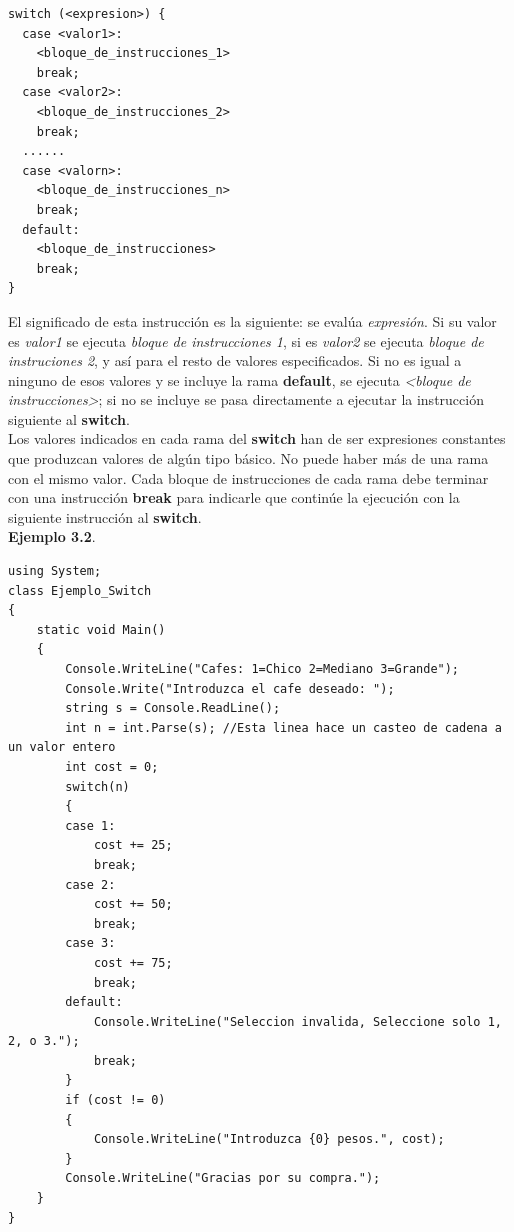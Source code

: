 \documentclass[12pt,a4paper]{report}
\begin{document}
\begin{lstlisting}
switch (<expresion>) {
  case <valor1>: 
    <bloque_de_instrucciones_1>
    break;
  case <valor2>: 
    <bloque_de_instrucciones_2>
    break;
  ......
  case <valorn>: 
    <bloque_de_instrucciones_n>
    break;
  default:
    <bloque_de_instrucciones>
    break;
}
\end{lstlisting}
El significado de esta instrucción es la siguiente: se evalúa \textit{expresión}. Si su valor es \textit{valor1} se ejecuta \textit{bloque de instrucciones 1}, si es \textit{valor2} se ejecuta \textit{bloque de instruciones 2}, y así para el resto de valores especificados. Si no es igual a ninguno de esos valores y se incluye la rama \textbf{default}, se ejecuta \textit{<bloque de instrucciones>}; si no se incluye se pasa directamente a ejecutar la instrucción siguiente al \textbf{switch}.\\Los valores indicados en cada rama del \textbf{switch} han de ser expresiones constantes que produzcan valores de algún tipo básico. No puede haber más de una rama con el mismo valor. Cada bloque de instrucciones de cada rama debe terminar con una instrucción \textbf{break} para indicarle que continúe la ejecución con la siguiente instrucción al \textbf{switch}.
\\\textbf{Ejemplo 3.2}.
\begin{lstlisting}
using System;
class Ejemplo_Switch 
{
    static void Main()
    {
        Console.WriteLine("Cafes: 1=Chico 2=Mediano 3=Grande"); 
        Console.Write("Introduzca el cafe deseado: "); 
        string s = Console.ReadLine(); 
        int n = int.Parse(s); //Esta linea hace un casteo de cadena a un valor entero
        int cost = 0;
        switch(n)
        {
        case 1:
            cost += 25;
            break;
        case 2:
            cost += 50;
            break;
        case 3:
            cost += 75;
            break;
        default:
            Console.WriteLine("Seleccion invalida, Seleccione solo 1, 2, o 3.");
            break;
        }
        if (cost != 0)
        {
            Console.WriteLine("Introduzca {0} pesos.", cost);
        }
        Console.WriteLine("Gracias por su compra.");
    }
}
\end{lstlisting}
\end{document}
